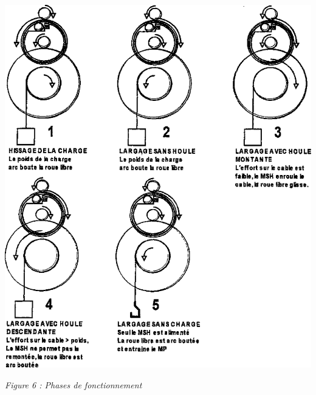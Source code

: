 \documentclass[10pt]{article}
\begin{document}
\begin{minipage}[c]{.49\linewidth}
\begin{center}
\includegraphics[width=\textwidth]{images/Treuil_02}

\textit{Figure 6 : Phases de fonctionnement}
\end{center}
\end{minipage} 



\end{document}

